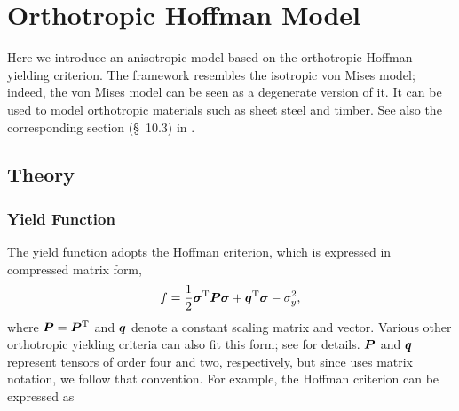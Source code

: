 \section{Orthotropic Hoffman Model}\label{sec:hoffman}
Here we introduce an anisotropic model based on the orthotropic Hoffman yielding criterion.
The framework resembles the isotropic von Mises model; indeed, the von Mises model can be seen as a degenerate version of it.
It can be used to model orthotropic materials such as sheet steel and timber.
See also the corresponding section (\S~10.3) in \cite{SouzaNeto2008}.
\subsection{Theory}
\subsubsection{Yield Function}
The yield function adopts the Hoffman criterion, which is expressed in compressed matrix form,
\begin{gather}\label{eq:orthotropic_yield_function_proto}
    f=\dfrac{1}{2}\bm{\sigma}^{\mathrm{T}}\bm{P}\bm{\sigma}+\bm{q}^{\mathrm{T}}\bm{\sigma}-\sigma_y^2,
\end{gather}
where $\bm{P}=\bm{P}^{\mathrm{T}}$ and $\bm{q}$ denote a constant scaling matrix and vector.
Various other orthotropic yielding criteria can also fit this form; see \cite{Oller2003} for details.
$\bm{P}$ and $\bm{q}$ represent tensors of order four and two, respectively, but since \cite{Oller2003} uses matrix notation, we follow that convention.
For example, the Hoffman criterion can be expressed as
